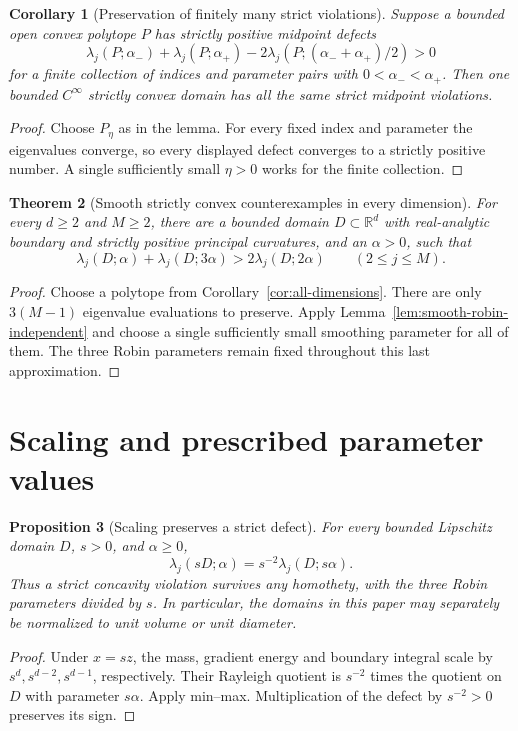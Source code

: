 \documentclass[11pt,a4paper]{article}
\newtheorem{theorem}{Theorem}[section]
\newtheorem{proposition}[theorem]{Proposition}
\newtheorem{corollary}[theorem]{Corollary}
\theoremstyle{definition}\newtheorem{definition}[theorem]{Definition}
\theoremstyle{remark}\newtheorem{remark}[theorem]{Remark}
\begin{document}
\begin{corollary}[Preservation of finitely many strict violations]
Suppose a bounded open convex polytope $P$ has strictly positive
midpoint defects
\[
 \lambda_j(P;\alpha_-)+\lambda_j(P;\alpha_+)
 -2\lambda_j(P;(\alpha_-+\alpha_+)/2)>0
\]
for a finite collection of indices and parameter pairs with
$0<\alpha_-<\alpha_+$. Then one bounded $C^\infty$ strictly convex
domain has all the same strict midpoint violations.
\end{corollary}

\begin{proof}
Choose $P_\eta$ as in the lemma. For every fixed index and parameter
the eigenvalues converge, so every displayed defect converges to a
strictly positive number. A single sufficiently small $\eta>0$ works
for the finite collection.
\end{proof}

\begin{theorem}[Smooth strictly convex counterexamples in every dimension]
\label{thm:smooth-counterexamples}
For every $d\geq2$ and $M\geq2$, there are a bounded domain
$D\subset\mathbb R^d$ with real-analytic boundary and strictly
positive principal curvatures, and an $\alpha>0$, such that
\[
 \lambda_j(D;\alpha)+\lambda_j(D;3\alpha)
          >2\lambda_j(D;2\alpha)
 \qquad(2\leq j\leq M).
\]
\end{theorem}
\begin{proof}
Choose a polytope from Corollary~\ref{cor:all-dimensions}.
There are only $3(M-1)$ eigenvalue evaluations to preserve.
Apply Lemma~\ref{lem:smooth-robin-independent} and choose a
single sufficiently small smoothing parameter for all of them.
The three Robin parameters remain fixed throughout this last
approximation.
\end{proof}
\section{Scaling and prescribed parameter values}\label{sec:scaling}

\begin{proposition}[Scaling preserves a strict defect]
\label{prop:scaling}
For every bounded Lipschitz domain $D$, $s>0$, and $\alpha\geq0$,
\begin{equation}\label{eq:scaling}
 \lambda_j(sD;\alpha)=s^{-2}\lambda_j(D;s\alpha).
\end{equation}
Thus a strict concavity violation survives any homothety, with
the three Robin parameters divided by $s$. In particular, the
domains in this paper may separately be normalized to unit volume
or unit diameter.
\end{proposition}
\begin{proof}
Under $x=sz$, the mass, gradient energy and boundary integral
scale by $s^d,s^{d-2},s^{d-1}$, respectively. Their Rayleigh
quotient is $s^{-2}$ times the quotient on $D$ with parameter
$s\alpha$. Apply min--max. Multiplication of the defect by
$s^{-2}>0$ preserves its sign.
\end{proof}
\end{document}
